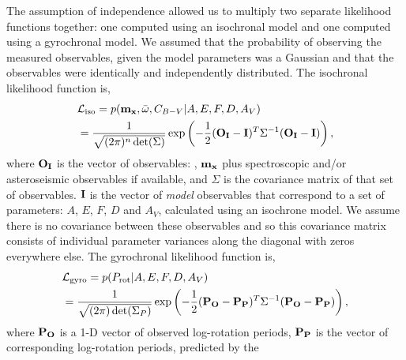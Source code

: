 The assumption of independence allowed us to multiply two separate likelihood
functions together: one computed using an isochronal model and one computed
using a gyrochronal model.
We assumed that the probability of observing the measured observables, given
the model parameters was a Gaussian and that the observables were identically
and independently distributed.
The isochronal likelihood function is,
\begin{eqnarray} \label{eqn:isochrones_only_likelihood}
    & \mathcal{L_{\mathrm{iso}}} = p({\bf m_x},
    \bar{\omega}, C_{B-V}|A, E, F, D,
    A_V) \\ \nonumber
    & = \frac{1}{\sqrt{(2\pi)^n \det(\Sigma)}}
    \exp\left( -\frac{1}{2} ({\bf O_I} - {\bf I})^T \Sigma ^{-1}
    ({\bf O_I} - {\bf I})\right),
\end{eqnarray}
where ${\bf O_I}$ is the vector of observables: \pmega, ${\bf m_x}$ plus
spectroscopic and/or asteroseismic observables if available, and $\Sigma$ is
the covariance matrix of that set of observables.
${\bf I}$ is the vector of {\it model} observables that correspond to a set of
parameters: $A$, $E$, $F$, $D$ and $A_V$, calculated using an isochrone model.
We assume there is no covariance between these observables and so this
covariance matrix consists of individual parameter variances along the
diagonal with zeros everywhere else.
The gyrochronal likelihood function is,
\begin{eqnarray} \label{eqn:gyro_likelihood}
    & \mathcal{L_{\mathrm{gyro}}} = p(P_\mathrm{rot} |A, E, F, D, A_V) \\ \nonumber
    & = \frac{1}{\sqrt{(2\pi) \det(\Sigma_P)}}
    \exp\left( -\frac{1}{2} ({\bf P_O} - {\bf P_P})^T \Sigma ^{-1}
    ({\bf P_O} - {\bf P_P})\right),
\end{eqnarray}
where ${\bf P_O}$ is a 1-D vector of observed log-rotation periods, ${\bf
P_P}$ is the vector of corresponding log-rotation periods, predicted by the
